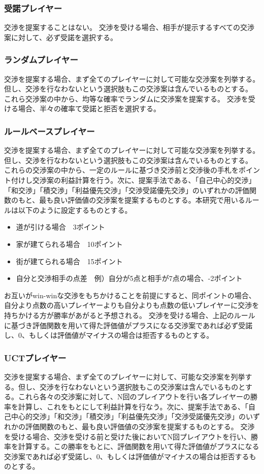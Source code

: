 \documentclass[a4, 10pt,dvipdfmx]{jsarticle}
\begin{document}
\subsubsection*{受諾プレイヤー}
交渉を提案することはない。
交渉を受ける場合、相手が提示するすべての交渉案に対して、必ず受諾を選択する。

\subsubsection*{ランダムプレイヤー}
交渉を提案する場合、まず全てのプレイヤーに対して可能な交渉案を列挙する。但し、交渉を行なわないという選択肢もこの交渉案は含んでいるものとする。
これら交渉案の中から、均等な確率でランダムに交渉案を提案する。
交渉を受ける場合、半々の確率て受諾と拒否を選択する。

\subsubsection*{ルールベースプレイヤー}
交渉を提案する場合、まず全てのプレイヤーに対して可能な交渉案を列挙する。但し、交渉を行なわないという選択肢もこの交渉案は含んでいるものとする。
これらの交渉案の中から、一定のルールに基づき交渉前と交渉後の手札をポイント付けし交渉案の利益計算を行う。次に、提案手法である、「自己中心的交渉」「和交渉」「積交渉」「利益優先交渉」「交渉受諾優先交渉」のいずれかの評価関数のもと、最も良い評価値の交渉案を提案するものとする。本研究で用いるルールは以下のように設定するものとする。

\begin{itemize}
 \item 道が引ける場合　3ポイント
 \item 家が建てられる場合　10ポイント
 \item 街が建てられる場合　15ポイント
 \item 自分と交渉相手の点差　例）自分が5点と相手が7点の場合、-2ポイント
\end{itemize}

お互いがwin-winな交渉をもちかけることを前提にすると、同ポイントの場合、自分より点数の高いプレイヤーよりも自分よりも点数の低いプレイヤーに交渉を持ちかける方が勝率があがると予想される。
交渉を受ける場合、上記のルールに基づき評価関数を用いて得た評価値がプラスになる交渉案であれば必ず受諾し、0、もしくは評価値がマイナスの場合は拒否するものとする。
\subsubsection*{UCTプレイヤー}
交渉を提案する場合、まず全てのプレイヤーに対して、可能な交渉案を列挙する。但し、交渉を行なわないという選択肢もこの交渉案は含んでいるものとする。これら各々の交渉案に対して、N回のプレイアウトを行い各プレイヤーの勝率を計算し、これをもとにして利益計算を行なう。次に、提案手法である、「自己中心的交渉」「和交渉」「積交渉」「利益優先交渉」「交渉受諾優先交渉」のいずれかの評価関数のもと、最も良い評価値の交渉案を提案するものとする。
交渉を受ける場合、交渉を受ける前と受けた後においてN回プレイアウトを行い、勝率を計算する。この勝率をもとに、評価関数を用いて得た評価値がプラスになる交渉案であれば必ず受諾し、0、もしくは評価値がマイナスの場合は拒否するものとする。
\end{document}
